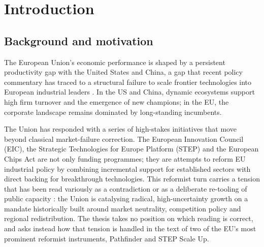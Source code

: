 %
\chapter{Introduction}
\label{ch:introduction}

\section{Background and motivation}
\label{sec:intro-background}

The European Union's economic performance is shaped by a persistent
productivity gap with the United States and China, a gap that recent
policy commentary has traced to a structural failure to scale frontier
technologies into European industrial leaders
\parencite{draghi2024future,letta2024much,ec2022jrcscoreboard}. In
the US and China, dynamic ecosystems support high firm turnover and the
emergence of new champions; in the EU, the corporate landscape remains
dominated by long-standing incumbents.

The Union has responded with a series of high-stakes initiatives that
move beyond classical market-failure correction. The European Innovation
Council (EIC), the Strategic Technologies for Europe Platform (STEP) and
the European Chips Act are not only funding programmes; they are
attempts to reform EU industrial policy by combining incremental support
for established sectors with direct backing for breakthrough
technologies. This reformist turn carries a tension that has been read
variously as a contradiction or as a deliberate re-tooling of public
capacity \parencite{mazzucato2013entrepreneurial}: the Union is catalysing
radical, high-uncertainty growth on a mandate historically built around
market neutrality, competition policy and regional redistribution. The
thesis takes no position on which reading is correct, and asks instead
how that tension is handled in the text of two of the EU's most
prominent reformist instruments, Pathfinder and STEP Scale Up.

